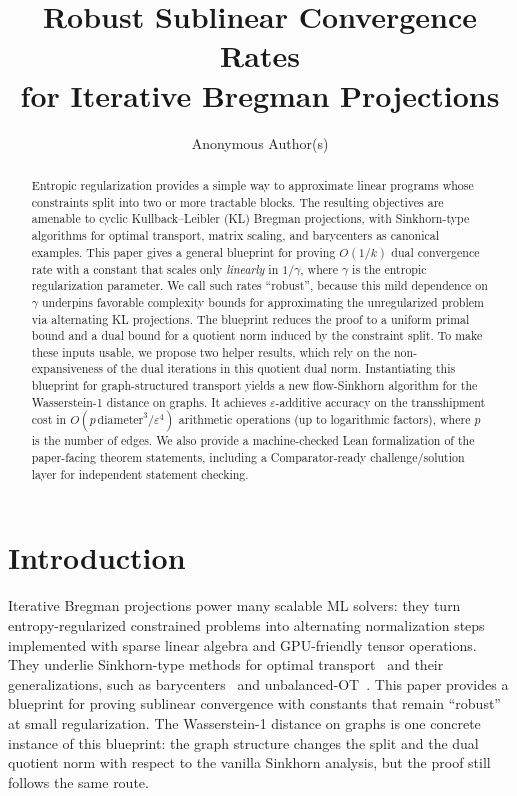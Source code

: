 \documentclass{article}
\title{Robust Sublinear Convergence Rates \\ for Iterative Bregman Projections}
\author{Anonymous Author(s)}
\theoremstyle{plain}
\renewcommand{\epsilon}{\varepsilon}
\begin{document}
\maketitle
\begin{abstract}
Entropic regularization provides a simple way to approximate linear programs whose constraints split into two or more tractable blocks. The resulting objectives are amenable to cyclic Kullback--Leibler (KL) Bregman projections, with Sinkhorn-type algorithms for optimal transport, matrix scaling, and barycenters as canonical examples.
%
This paper gives a general blueprint for proving  $O(1/k)$ dual convergence rate with a constant that scales only \emph{linearly} in $1/\gamma$, where $\gamma$ is the entropic regularization parameter. We call such rates ``robust'', because this mild dependence on $\gamma$ underpins favorable complexity bounds for approximating the unregularized problem via alternating KL projections.
%
The blueprint reduces the proof to a uniform primal bound and a dual bound for a quotient norm induced by the constraint split. To make these inputs usable, we propose two helper results, which rely on the non-expansiveness of the dual iterations in this quotient dual norm. 
%
Instantiating this blueprint for graph-structured transport yields a new flow-Sinkhorn algorithm for the Wasserstein-1 distance on graphs. It achieves $\epsilon$-additive accuracy on the transshipment cost in $O(p\,\mathrm{diameter}^3/\epsilon^{4})$ arithmetic operations (up to logarithmic factors), where $p$ is the number of edges.
%
We also provide a machine-checked Lean formalization of the paper-facing theorem statements, including a Comparator-ready challenge/solution layer for independent statement checking.
\end{abstract}

\section{Introduction}

Iterative Bregman projections power many scalable ML solvers: they turn entropy-regularized constrained problems into alternating normalization steps implemented with sparse linear algebra and GPU-friendly tensor operations. They underlie Sinkhorn-type methods for optimal transport~\citep{Cuturi13} and their generalizations, such as barycenters~\citep{benamou2015iterative} and unbalanced-OT~\citep{chizat2018scaling}. This paper provides a blueprint for proving sublinear convergence with constants that remain ``robust'' at small regularization. The Wasserstein-1 distance on graphs is one concrete instance of this blueprint: the graph structure changes the split and the dual quotient norm with respect to the vanilla Sinkhorn analysis, but the proof still follows the same route.
\end{document}
